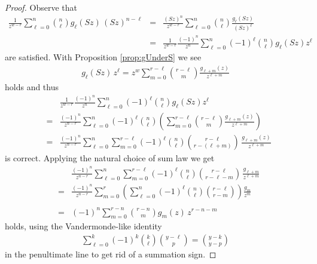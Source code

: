 \documentclass[11pt]{article}
\begin{document}
    \begin{proof}
        Observe that
            \begin{eqnarray*}
               \frac{1}{z^{w-r}} \sum_{\ell=0}^{n}\binom{n}{\ell}{g_{\ell}(Sz)}\,{(Sz)^{n-\ell}} &=& \frac{(Sz)^n}{z^{w-r}} \sum_{\ell=0}^{n}\binom{n}{\ell}\frac{g_\ell(Sz)}{(Sz)^\ell} \\
               &=& \frac{1}{z^{w-r}}\frac{(-1)^n}{z^n}\sum_{\ell = 0}^{n}(-1)^\ell \binom{n}{\ell}{g_\ell(Sz)}{z^\ell}
            \end{eqnarray*}
        are satisfied. With Proposition \ref{prop:gUnderS} we see
            \begin{eqnarray*}
                {g_\ell(Sz)}\,z^\ell = z^{w}\sum_{m=0}^{r-\ell}\binom{r-\ell}{m}\frac{g_{\ell + m}(z)}{z^{\ell + m}}
            \end{eqnarray*}
        holds and thus 
            \begin{eqnarray*}
               &{}& \frac{1}{z^{w-r}}\frac{(-1)^n}{z^n}\sum_{\ell = 0}^{n}(-1)^\ell \binom{n}{\ell}{g_\ell(Sz)}{z^\ell} \\ &=& \frac{(-1)^n}{z^{n-r}}\sum_{\ell = 0}^{n}(-1)^\ell \binom{n}{\ell}\left(\sum_{m=0}^{r-\ell}\binom{r-\ell}{m}\frac{g_{\ell + m}(z)}{z^{\ell + m}} \right)\\  &=& \frac{(-1)^n}{z^{n-r}}\sum_{\ell = 0}^{n}\sum_{m=0}^{r-\ell}(-1)^\ell \binom{n}{\ell}\binom{r-\ell}{r-(\ell + m)} \,\frac{g_{\ell + m}(z)}{z^{\ell + m}} 
            \end{eqnarray*}
        is correct. Applying the natural choice of sum law we get
            \begin{eqnarray*}
                &{}& \frac{(-1)^n}{z^{n-r}}\sum_{\ell = 0}^{n}\sum_{m=0}^{r-\ell}(-1)^\ell \binom{n}{\ell}\binom{r-\ell}{r-\ell - m} \,\frac{g_{\ell + m}}{z^{\ell + m}}\\ &=& \frac{(-1)^n}{z^{n-r}}\sum_{m = 0}^{r}\left(\sum_{\ell=0}^{n}(-1)^\ell \binom{n}{\ell}\binom{r-\ell}{r-m}\right) \frac{g_{m}}{z^{m}}\\ \\
                &=& {(-1)^n}\sum_{m = 0}^{r-n}\binom{r-n}{m} {g_{m}(z)}\,{z^{r-n- m}}
            \end{eqnarray*}
        holds, using the Vandermonde-like identity 
            \begin{eqnarray*}
                \sum_{\ell=0}^k (-1)^k\binom{k}{\ell}\binom{y-\ell}{p} = \binom{y-k}{y-p}
            \end{eqnarray*}
        in the penultimate line to get rid of a summation sign. 
    \end{proof}
\end{document}
